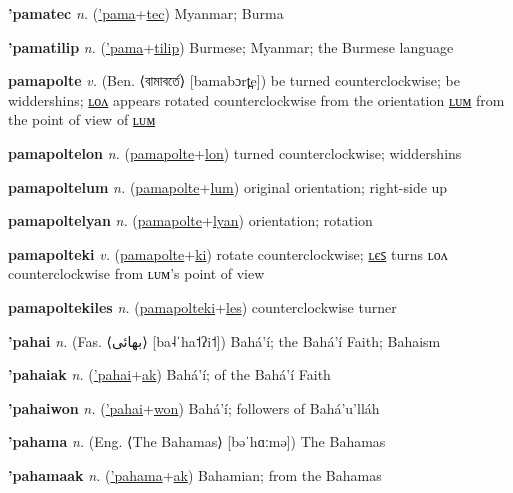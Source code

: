 \textbf{\hypertarget{'pamatec}{'pamatec}} \textit{n.} (\hyperlink{'pama}{'pama}+\allowbreak \hyperlink{tec}{tec})
Myanmar; Burma

\textbf{\hypertarget{'pamatilip}{'pamatilip}} \textit{n.} (\hyperlink{'pama}{'pama}+\allowbreak \hyperlink{tilip}{tilip})
Burmese; Myanmar; the Burmese language

\textbf{\hypertarget{pamapolte}{pamapolte}} \textit{v.} (Ben. ⟨{\bengali{}বামাবর্তে}⟩ [bamabɔrt̪e])
be turned counterclockwise; be widdershins; \hyperlink{pamapoltelon}{ʟᴏᴧ} appears rotated counterclockwise from the orientation \hyperlink{pamapoltelum}{ʟᴜᴍ} from the point of view of \hyperlink{pamapoltelum}{ʟᴜᴍ}

\textbf{\hypertarget{pamapoltelon}{pamapoltelon}} \textit{n.} (\hyperlink{pamapolte}{pamapolte}+\allowbreak \hyperlink{lon}{lon})
turned counterclockwise; widdershins

\textbf{\hypertarget{pamapoltelum}{pamapoltelum}} \textit{n.} (\hyperlink{pamapolte}{pamapolte}+\allowbreak \hyperlink{lum}{lum})
original orientation; right-side up

\textbf{\hypertarget{pamapoltelyan}{pamapoltelyan}} \textit{n.} (\hyperlink{pamapolte}{pamapolte}+\allowbreak \hyperlink{lyan}{lyan})
orientation; rotation

\textbf{\hypertarget{pamapolteki}{pamapolteki}} \textit{v.} (\hyperlink{pamapolte}{pamapolte}+\allowbreak \hyperlink{ki}{ki})
rotate counterclockwise; \hyperlink{pamapoltekiles}{ʟєꜱ} turns ʟᴏᴧ counterclockwise from ʟᴜᴍ’s point of view

\textbf{\hypertarget{pamapoltekiles}{pamapoltekiles}} \textit{n.} (\hyperlink{pamapolteki}{pamapolteki}+\allowbreak \hyperlink{les}{les})
counterclockwise turner

\textbf{\hypertarget{'pahai}{'pahai}} \textit{n.} (Fas. ⟨{\arabics{}بهائی‎}⟩ [ba˨ˈha˦ʔi˦])
Bahá’í; the Bahá’í Faith; Bahaism

\textbf{\hypertarget{'pahaiak}{'pahaiak}} \textit{n.} (\hyperlink{'pahai}{'pahai}+\allowbreak \hyperlink{ak}{ak})
Bahá’í; of the Bahá’í Faith

\textbf{\hypertarget{'pahaiwon}{'pahaiwon}} \textit{n.} (\hyperlink{'pahai}{'pahai}+\allowbreak \hyperlink{won}{won})
Bahá’í; followers of Bahá’u’lláh

\textbf{\hypertarget{'pahama}{'pahama}} \textit{n.} (Eng. ⟨The Bahamas⟩ [bəˈhɑːmə])
The Bahamas

\textbf{\hypertarget{'pahamaak}{'pahamaak}} \textit{n.} (\hyperlink{'pahama}{'pahama}+\allowbreak \hyperlink{ak}{ak})
Bahamian; from the Bahamas


